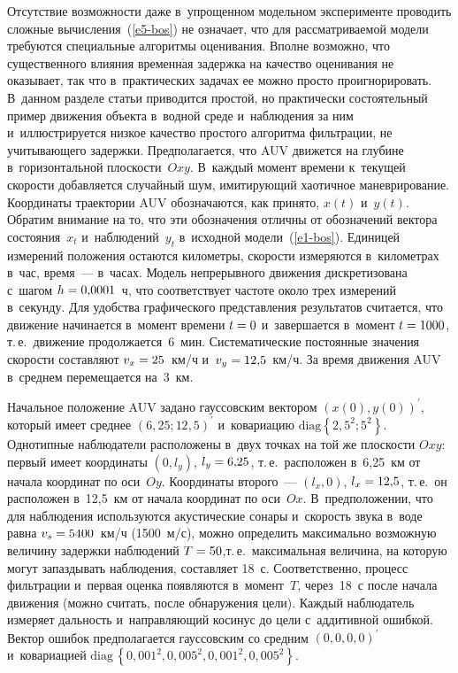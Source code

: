 \begin{multicols}{2}
     Отсутствие возможности даже в~упрощенном модельном эксперименте 
проводить слож\-ные вы\-чис\-ле\-ния~(\ref{e5-bos}) не означает, что для 
рас\-смат\-ри\-ва\-емой модели требуются специальные алгоритмы оценивания. 
Впол\-не возможно, что существенного влияния временн$\acute{\mbox{а}}$я за\-держ\-ка на 
качество оценивания не оказывает, так что в~практических задачах ее можно 
прос\-то проигнорировать. В~данном разделе \mbox{статьи} приводится прос\-той, но 
практически со\-сто\-ятель\-ный пример движения объекта в~водной среде 
и~наблюдения за ним и~иллюстрируется низ\-кое качество прос\-то\-го алгоритма 
фильт\-ра\-ции, не учи\-ты\-ва\-юще\-го задержки. Предполагается, что AUV 
движется на глубине в~горизонтальной плос\-кости~$Oxy$. В~каж\-дый момент 
времени к~текущей ско\-рости добавляется случайный шум, ими\-ти\-ру\-ющий 
хаотичное маневрирование. Координаты траектории AUV обозначаются, как 
принято, $x(t)$ и~$y(t)$. Обратим внимание на то, что эти обозначения 
отличны от обозначений вектора со\-сто\-яния~$x_t$ и~наблюдений~$y_t$ 
в~исходной модели~(\ref{e1-bos}). Единицей измерений положения остаются 
ки\-ло\-мет\-ры, скорости измеряются в~километрах в~час, время~--- в~часах. Модель 
непрерывного движения дискретизована с~шагом $h\hm= 0{,}0001$~ч, что 
соответствует час\-то\-те около трех измерений в~секунду. Для удобства 
графического пред\-став\-ле\-ния результатов считается, что движение 
начинается в~момент времени $t\hm=0$ и~завершается в~момент $t\hm= 
1000$, т.\,е.\ движение продолжается~6~мин. Сис\-те\-ма\-ти\-че\-ские по\-сто\-ян\-ные 
значения ско\-рости со\-став\-ляют $v_x\hm= 25$~км/ч и~$v_y\hm= 12{,}5$~км/ч. 
За время движения AUV в~сред\-нем перемещается на~3~км.
     
     Начальное положение AUV задано гауссовским вектором $(x(0), 
y(0))^\prime$, который имеет среднее $(6{,}25; 12{,}5)^\prime$ и~ковариацию 
$\mathrm{diag}\left\{ 2{,}5^2; 5^2\right\}$. Однотипные наблюдатели 
расположены в~двух точках на той же плос\-кости $Oxy$: первый имеет 
координаты $(0,l_y)$, $l_y\hm= 6{,}25$, т.\,е.\ расположен в~6,25~км от начала 
координат по оси~$Oy$. Координаты второго~--- $(l_x,0)$, $l_x\hm= 12{,}5$, 
т.\,е.\ он расположен в~12,5~км\linebreak
 от начала координат по оси~$Ox$. 
В~предположении, что для наблюдения используются акус\-ти\-че\-ские сонары и~ско\-рость звука 
в~воде рав\-на $v_s\hm= 5400$~км/ч (1500~м/с), мож\-но 
определить \mbox{максимально} воз\-мож\-ную величину за\-держ\-ки наблюдений 
$T\hm=50$,\linebreak т.\,е.\ максимальная величина, на которую могут за\-паз\-ды\-вать 
наблюдения, со\-став\-ля\-ет 18~с. Соответственно, процесс фильт\-ра\-ции и~пер\-вая 
оцен\-ка появляются в~момент~$T$, через~18~с после \mbox{начала} движения 
(мож\-но считать, после обнаружения цели). Каж\-дый наблюдатель измеряет 
даль\-ность и~на\-прав\-ля\-ющий косинус до цели с~ад\-ди\-тив\-ной ошиб\-кой. Век\-тор 
ошибок предполагается гауссовским со сред\-ним $(0,0,0,0)^\prime$ 
и~ковариацией $\mathrm{diag}\,\left\{ 0{,}001^2, 0{,}005^2, 0{,}001^2, 
0{,}005^2\right\}$. 
     

\end{multicols}
